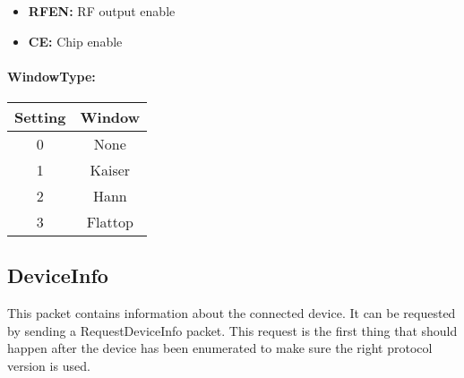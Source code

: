 \documentclass[a4paper,11pt]{article}
\begin{document}
\begin{itemize}
\item \textbf{RFEN:} RF output enable
\item \textbf{CE:} Chip enable
\end{itemize}

\paragraph{WindowType:}
\begin{center}
\begin{tabular}{ c|c }
Setting & Window\\
 \hline
0 & None \\
1 & Kaiser\\
2 & Hann\\
3 & Flattop\\
\end{tabular}
\end{center}

\subsection{DeviceInfo}
This packet contains information about the connected device. It can be requested by sending a RequestDeviceInfo packet. This request is the first thing that should happen after the device has been enumerated to make sure the right protocol version is used.
\end{document}
